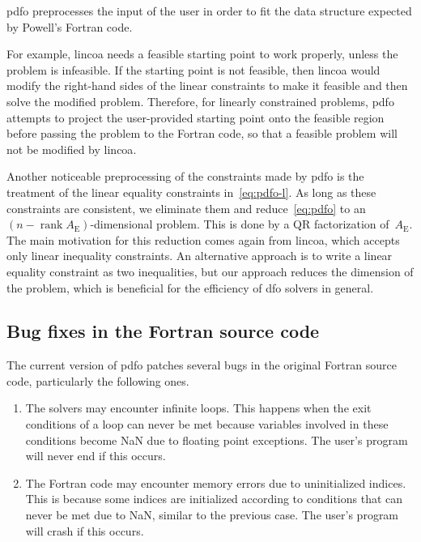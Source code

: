 \documentclass[manuscript,screen,review]{acmart}
\numberwithin{equation}{section}
\DeclareMathOperator{\rank}{rank}
\newcommand*{\aeq}{A_{\scriptscriptstyle\text{E}}}
\begin{document}
\Gls{pdfo} preprocesses the input of the user in order to fit the data structure expected by Powell's Fortran code.

For example, \gls{lincoa} needs a feasible starting point to work properly, unless the problem is infeasible.
If the starting point is not feasible, then \gls{lincoa} would modify the right-hand sides of the linear constraints to make it feasible and then solve the modified problem.
Therefore, for linearly constrained problems, \gls{pdfo} attempts to project the user-provided starting point onto the feasible region before passing the problem to the Fortran code, so that a feasible problem will not be modified by \gls{lincoa}.

Another noticeable preprocessing of the constraints made by \gls{pdfo} is the treatment of the linear equality constraints in~\eqref{eq:pdfo-l}.
As long as these constraints are consistent, we eliminate them and reduce~\eqref{eq:pdfo} to an~$(n - \rank \aeq)$-dimensional problem.
This is done by a QR factorization of~$\aeq$.
The main motivation for this reduction comes again from \gls{lincoa}, which accepts only linear inequality constraints.
An alternative approach is to write a linear equality constraint as two inequalities, but our approach reduces the dimension of the problem, which is beneficial for the efficiency of \gls{dfo} solvers in general.

\subsection{Bug fixes in the Fortran source code}
\label{subsec:bug-corrections}

The current version of \gls{pdfo} patches several bugs in the original Fortran source code, particularly the following ones.
\begin{enumerate}
    \item The solvers may encounter infinite loops.
    This happens when the exit conditions of a loop can never be met because variables involved in these conditions become NaN due to floating point exceptions.
    The user's program will never end if this occurs.
    \item The Fortran code may encounter memory errors due to uninitialized indices.
    This is because some indices are initialized according to conditions that can never be met due to NaN, similar to the previous case.
    The user's program will crash if this occurs.
\end{enumerate}
\end{document}
